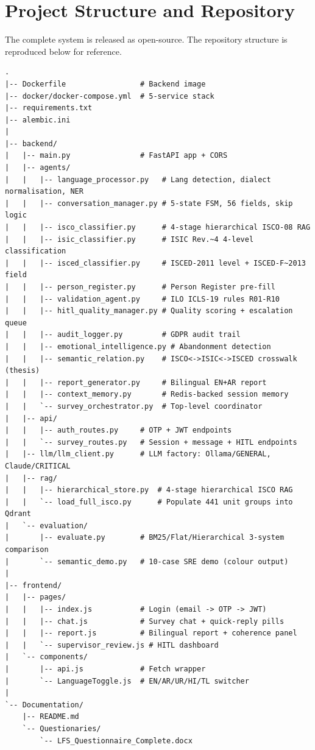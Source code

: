 \chapter{Project Structure and Repository}
\label{app:structure}

The complete system is released as open-source.
The repository structure is reproduced below for reference.

\begin{lstlisting}[breaklines=true,caption={Project directory structure.}]
.
|-- Dockerfile                 # Backend image
|-- docker/docker-compose.yml  # 5-service stack
|-- requirements.txt
|-- alembic.ini
|
|-- backend/
|   |-- main.py                # FastAPI app + CORS
|   |-- agents/
|   |   |-- language_processor.py   # Lang detection, dialect normalisation, NER
|   |   |-- conversation_manager.py # 5-state FSM, 56 fields, skip logic
|   |   |-- isco_classifier.py      # 4-stage hierarchical ISCO-08 RAG
|   |   |-- isic_classifier.py      # ISIC Rev.~4 4-level classification
|   |   |-- isced_classifier.py     # ISCED-2011 level + ISCED-F~2013 field
|   |   |-- person_register.py      # Person Register pre-fill
|   |   |-- validation_agent.py     # ILO ICLS-19 rules R01-R10
|   |   |-- hitl_quality_manager.py # Quality scoring + escalation queue
|   |   |-- audit_logger.py         # GDPR audit trail
|   |   |-- emotional_intelligence.py # Abandonment detection
|   |   |-- semantic_relation.py    # ISCO<->ISIC<->ISCED crosswalk (thesis)
|   |   |-- report_generator.py     # Bilingual EN+AR report
|   |   |-- context_memory.py       # Redis-backed session memory
|   |   `-- survey_orchestrator.py  # Top-level coordinator
|   |-- api/
|   |   |-- auth_routes.py     # OTP + JWT endpoints
|   |   `-- survey_routes.py   # Session + message + HITL endpoints
|   |-- llm/llm_client.py      # LLM factory: Ollama/GENERAL, Claude/CRITICAL
|   |-- rag/
|   |   |-- hierarchical_store.py  # 4-stage hierarchical ISCO RAG
|   |   `-- load_full_isco.py      # Populate 441 unit groups into Qdrant
|   `-- evaluation/
|       |-- evaluate.py        # BM25/Flat/Hierarchical 3-system comparison
|       `-- semantic_demo.py   # 10-case SRE demo (colour output)
|
|-- frontend/
|   |-- pages/
|   |   |-- index.js           # Login (email -> OTP -> JWT)
|   |   |-- chat.js            # Survey chat + quick-reply pills
|   |   |-- report.js          # Bilingual report + coherence panel
|   |   `-- supervisor_review.js # HITL dashboard
|   `-- components/
|       |-- api.js             # Fetch wrapper
|       `-- LanguageToggle.js  # EN/AR/UR/HI/TL switcher
|
`-- Documentation/
    |-- README.md
    `-- Questionaries/
        `-- LFS_Questionnaire_Complete.docx
\end{lstlisting}
